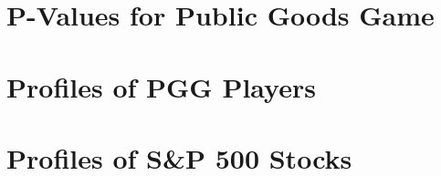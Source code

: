 







\begin{appendices}
\chapter{P-Values for Public Goods Game}
\label{App:P-Values-for-Public-Goods-Game}


\chapter{Profiles of PGG Players}
\label{App:Profiles_of_Public_Goods_Game_Players}


\chapter{Profiles of S\&P 500 Stocks}
\label{App:Profiles_of_SANDP}

\end{appendices}



